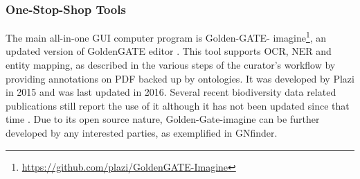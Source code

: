    \subsubsection{One-Stop-Shop Tools}
The main all-in-one GUI computer program is Golden-GATE-
imagine\footnote{\url{https://github.com/plazi/GoldenGATE-Imagine}}, an updated
version of GoldenGATE editor \cite{sautter_semi-automated_2007}. This tool
supports OCR, NER and entity mapping, as described in the various steps of the
curator’s workflow by providing annotations on PDF backed up by ontologies. It
was developed by Plazi in 2015 and was last updated in 2016. Several recent
biodiversity data related publications still report the use of it although it
has not been updated since that time
\cite{10.3897/biss.3.37078,rivera-quiroz_extracting_2019,10.3897/biss.4.59178}.
Due to its open source nature, Golden-Gate-imagine can be further developed by
any interested parties, as exemplified in GNfinder.

\begin{table}[ht]
\large
{}
\caption{The platforms where the CLI workflow was tested.Please note that running time can be affected by internet speed and stability due to API calls. The workflow uses open source tools and software libraries that are distributed across the major platforms; Linux, Mac and Windows.}
\label{table-CLI}
\end{table}

